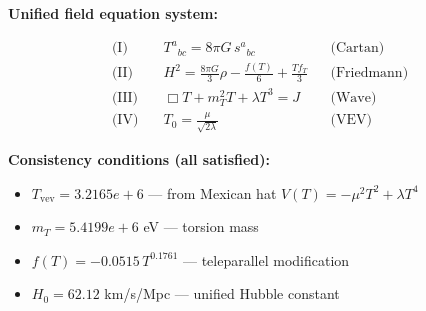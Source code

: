 
\textbf{Unified field equation system:}

\begin{align}
  \text{(I)} \quad & T^a{}_{bc} = 8\pi G \, s^a{}_{bc} && \text{(Cartan)} \\
  \text{(II)} \quad & H^2 = \frac{8\pi G}{3}\rho - \frac{f(T)}{6} + \frac{Tf_T}{3} && \text{(Friedmann)} \\
  \text{(III)} \quad & \Box T + m_T^2 T + \lambda T^3 = J && \text{(Wave)} \\
  \text{(IV)} \quad & T_0 = \frac{\mu}{\sqrt{2\lambda}} && \text{(VEV)}
\end{align}

\textbf{Consistency conditions (all satisfied):}
\begin{itemize}
  \item $T_{\text{vev}} = 3.2165e+6$ — from Mexican hat $V(T) = -\mu^2 T^2 + \lambda T^4$
  \item $m_T = 5.4199e+6$ eV — torsion mass
  \item $f(T) = -0.0515 \, T^{0.1761}$ — teleparallel modification
  \item $H_0 = 62.12$ km/s/Mpc — unified Hubble constant
\end{itemize}